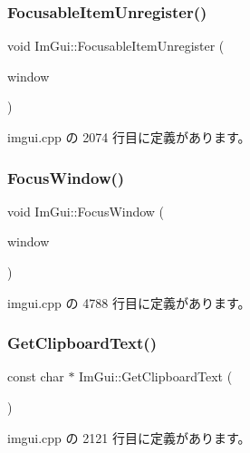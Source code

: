 \subsubsection{\texorpdfstring{Focusable\+Item\+Unregister()}{FocusableItemUnregister()}}
{\footnotesize\ttfamily void Im\+Gui\+::\+Focusable\+Item\+Unregister (\begin{DoxyParamCaption}\item[{\mbox{\hyperlink{struct_im_gui_window}{Im\+Gui\+Window}} $\ast$}]{window }\end{DoxyParamCaption})}



 imgui.\+cpp の 2074 行目に定義があります。

\mbox{\label{namespace_im_gui_ade4c08e7e7ad7bbfa4835248f5f3a7c6}} 
\subsubsection{\texorpdfstring{Focus\+Window()}{FocusWindow()}}
{\footnotesize\ttfamily void Im\+Gui\+::\+Focus\+Window (\begin{DoxyParamCaption}\item[{\mbox{\hyperlink{struct_im_gui_window}{Im\+Gui\+Window}} $\ast$}]{window }\end{DoxyParamCaption})}



 imgui.\+cpp の 4788 行目に定義があります。

\mbox{\label{namespace_im_gui_a11837daee819fd90e17d80ab1eef1f99}} 
\subsubsection{\texorpdfstring{Get\+Clipboard\+Text()}{GetClipboardText()}}
{\footnotesize\ttfamily const char $\ast$ Im\+Gui\+::\+Get\+Clipboard\+Text (\begin{DoxyParamCaption}{ }\end{DoxyParamCaption})}



 imgui.\+cpp の 2121 行目に定義があります。

\mbox{\label{namespace_im_gui_a0de2d9bd347d9866511eb8d014e62556}} 
